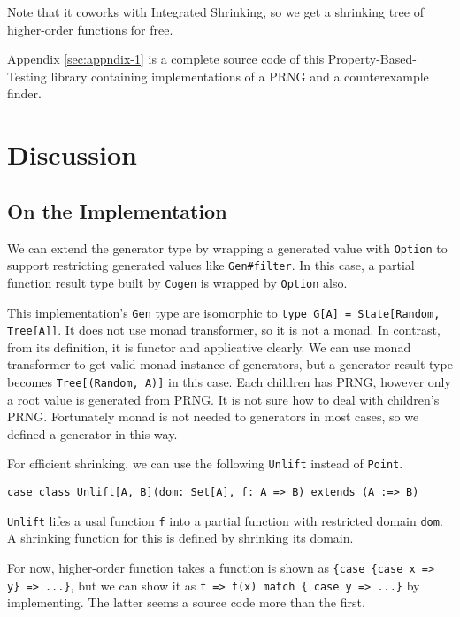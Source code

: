 \documentclass[a4paper,10pt]{article}
\theoremstyle{definition}
\begin{document}
Note that it coworks with Integrated Shrinking, so we get a shrinking tree of higher-order functions for free.

Appendix \ref{sec:appndix-1} is a complete source code of this Property-Based-Testing library containing implementations of a PRNG and a counterexample finder.

\section{Discussion}

\subsection{On the Implementation}

We can extend the generator type by wrapping a generated value with \texttt{Option} to support restricting generated values like \texttt{Gen\#filter}.
In this case, a partial function result type built by \texttt{Cogen} is wrapped by \texttt{Option} also.

This implementation's \texttt{Gen} type are isomorphic to \texttt{type G[A] = State[Random, Tree[A]]}.
It does not use monad transformer, so it is not a monad.
In contrast, from its definition, it is functor and applicative clearly.
We can use monad transformer to get valid monad instance of generators, but a generator result type becomes \texttt{Tree[(Random, A)]} in this case.
Each children has PRNG, however only a root value is generated from PRNG.
It is not sure how to deal with children's PRNG.
Fortunately monad is not needed to generators in most cases, so we defined a generator in this way.

For efficient shrinking, we can use the following \texttt{Unlift} instead of \texttt{Point}.

\begin{verbatim}
case class Unlift[A, B](dom: Set[A], f: A => B) extends (A :=> B)
\end{verbatim}

\texttt{Unlift} lifes a usal function \texttt{f} into a partial function with restricted domain \texttt{dom}.
A shrinking function for this is defined by shrinking its domain.

For now, higher-order function takes a function is shown as \texttt{\{case \{case x => y\} => ...\}}, but we can show it as \texttt{f => f(x) match \{ case y => ...\}} by implementing.
The latter seems a source code more than the first.
\end{document}
